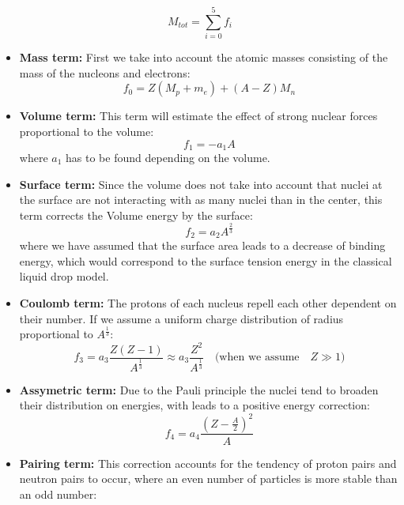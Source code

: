 \begin{equation}
    M_{tot} = \sum_{i=0}^{5} f_i 
\end{equation}
\begin{itemize}
    \item \textbf{Mass term:} 
First we take into account the atomic masses 
consisting of the mass of the nucleons and electrons:
\begin{equation}
    f_0 = Z(M_p + m_e) + (A-Z)M_n
\end{equation}
    \item \textbf{Volume term:} This term will estimate the effect of strong 
        nuclear forces proportional to the volume:
        \begin{equation}
            f_1 = -a_1 A
        \end{equation}
where $a_1$ has to be found depending on the volume. 
    \item \textbf{Surface term:} Since the volume does not take into account that nuclei at the surface are not
        interacting with as many nuclei than in the center, this term corrects the Volume energy by 
        the surface:
        \begin{equation}
            f_2 = a_2 A^{\frac{2}{3}}
        \end{equation}
        where we have assumed that the surface area leads to a decrease of binding energy, which would
        correspond to the surface tension energy in the classical liquid drop model.
    \item \textbf{Coulomb term:} The protons of each nucleus repell each other dependent on their number.
        If we assume a uniform charge distribution of radius proportional to $A^{\frac{1}{3}}$:
        \begin{equation}
            f_3 = a_3 \frac{Z(Z-1)}{A^{\frac{1}{3}}} \approx a_3 \frac{Z^2}{A^{\frac{1}{3}}} 
            \quad \text{(when we assume} \quad Z \gg 1)
        \end{equation}
    \item \textbf{Assymetric term:} Due to the Pauli principle the nuclei tend to broaden their distribution
        on energies, with leads to a positive energy correction:
\begin{equation}
    f_4 = a_4 \frac{(Z- \frac{A}{2})^2}{A}
\end{equation}
    \item \textbf{Pairing term:} This correction accounts for the tendency of proton pairs and neutron pairs
        to occur, where an even number of particles is more stable than an odd number:

\end{itemize}
